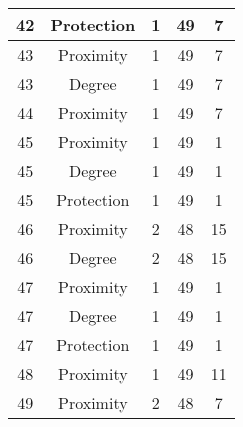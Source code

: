 \documentclass[results.tex]{subfiles}
\begin{document}
\begin{center}
\begin{tabular}{| c || c | c | c | c |}
            \hline
            42                      & Protection                   & 1                      & 49                      & 7                    \\
            \hline
            43                      & Proximity                    & 1                      & 49                      & 7                    \\
            \hline
            43                      & Degree                       & 1                      & 49                      & 7                    \\
            \hline
            44                      & Proximity                    & 1                      & 49                      & 7                    \\
            \hline
            45                      & Proximity                    & 1                      & 49                      & 1                    \\
            \hline
            45                      & Degree                       & 1                      & 49                      & 1                    \\
            \hline
            45                      & Protection                   & 1                      & 49                      & 1                    \\
            \hline
            46                      & Proximity                    & 2                      & 48                      & 15                   \\
            \hline
            46                      & Degree                       & 2                      & 48                      & 15                   \\
            \hline
            47                      & Proximity                    & 1                      & 49                      & 1                    \\
            \hline
            47                      & Degree                       & 1                      & 49                      & 1                    \\
            \hline
            47                      & Protection                   & 1                      & 49                      & 1                    \\
            \hline
            48                      & Proximity                    & 1                      & 49                      & 11                   \\
            \hline
            49                      & Proximity                    & 2                      & 48                      & 7                    \\
            \hline
        \end{tabular}
    \end{center}
\end{document}
